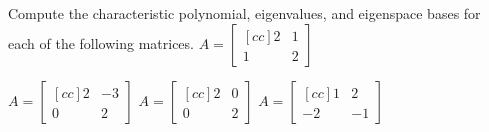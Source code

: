\bb [itemsep=5pt]
\ii Compute the characteristic polynomial, eigenvalues, and eigenspace bases for each of the following matrices.
\bb[itemsep=5pt]
\ii
$A=
\begin{bmatrix}[cc]
2&1\\
1&2
\end{bmatrix}
$

\ii
$A=
\begin{bmatrix}[cc]
2&-3\\
0&2
\end{bmatrix}
$
\ii
$A=
\begin{bmatrix}[cc]
2&0\\
0&2
\end{bmatrix}
$
\ii 
$A=
\begin{bmatrix}[cc]
1&2\\
-2&-1
\end{bmatrix}
$
\ee
